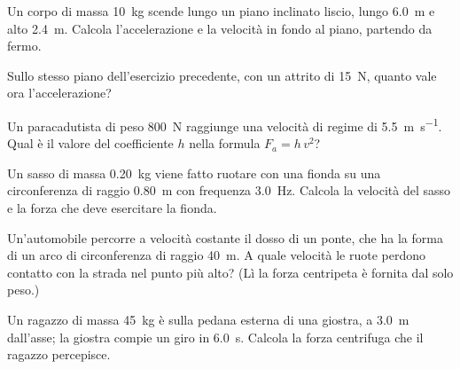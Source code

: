 \begin{esercizio}
Un corpo di massa \SI{10}{\kilo\gram} scende lungo un piano inclinato liscio, lungo \SI{6,0}{\metre} e alto \SI{2,4}{\metre}. Calcola l'accelerazione e la velocità in fondo al piano, partendo da fermo.\\
\end{esercizio}

\begin{esercizio}
Sullo stesso piano dell'esercizio precedente, con un attrito di \SI{15}{\newton}, quanto vale ora l'accelerazione?\\
\end{esercizio}

\begin{esercizio}
Un paracadutista di peso \SI{800}{\newton} raggiunge una velocità di regime di \SI{5,5}{\metre\per\second}. Qual è il valore del coefficiente $h$ nella formula $F_a = h\,v^2$?\\
\end{esercizio}

\begin{esercizio}
Un sasso di massa \SI{0,20}{\kilo\gram} viene fatto ruotare con una fionda su una circonferenza di raggio \SI{0,80}{\metre} con frequenza \SI{3,0}{\hertz}. Calcola la velocità del sasso e la forza che deve esercitare la fionda.\\
\end{esercizio}

\begin{esercizio}
Un'automobile percorre a velocità costante il dosso di un ponte, che ha la forma di un arco di circonferenza di raggio \SI{40}{\metre}. A quale velocità le ruote perdono contatto con la strada nel punto più alto? (Lì la forza centripeta è fornita dal solo peso.)\\
\end{esercizio}

\begin{esercizio}
Un ragazzo di massa \SI{45}{\kilo\gram} è sulla pedana esterna di una giostra, a \SI{3,0}{\metre} dall'asse; la giostra compie un giro in \SI{6,0}{\second}. Calcola la forza centrifuga che il ragazzo percepisce.\\
\end{esercizio}

